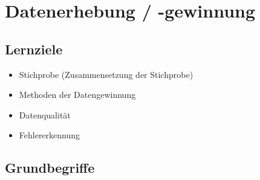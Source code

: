 \section{Datenerhebung / -gewinnung}

\subsection*{Lernziele}

\begin{itemize}
\item Stichprobe (Zusammensetzung der Stichprobe)
\item Methoden der Datengewinnung
\item Datenqualität
\item Fehlererkennung
\end{itemize}



\newpage


\subsection{Grundbegriffe}

